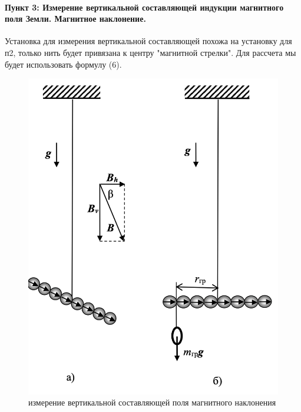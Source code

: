 \documentclass[a4paper,12pt]{article}
\begin{document}
\paragraph{Пункт 3: Измерение вертикальной составляющей индукции магнитного поля Земли. Магнитное наклонение.}
Установка для измерения вертикальной составляющей похожа на установку для п2, только нить будет привязана к центру "магнитной стрелки". Для рассчета мы будет использовать формулу (6). 
\begin{figure}[h!]
\centering
\includegraphics[scale=0.25]{ris4.png} 
\caption{измерение вертикальной составляющей поля магнитного наклонения}
\end{figure}
\end{document}
